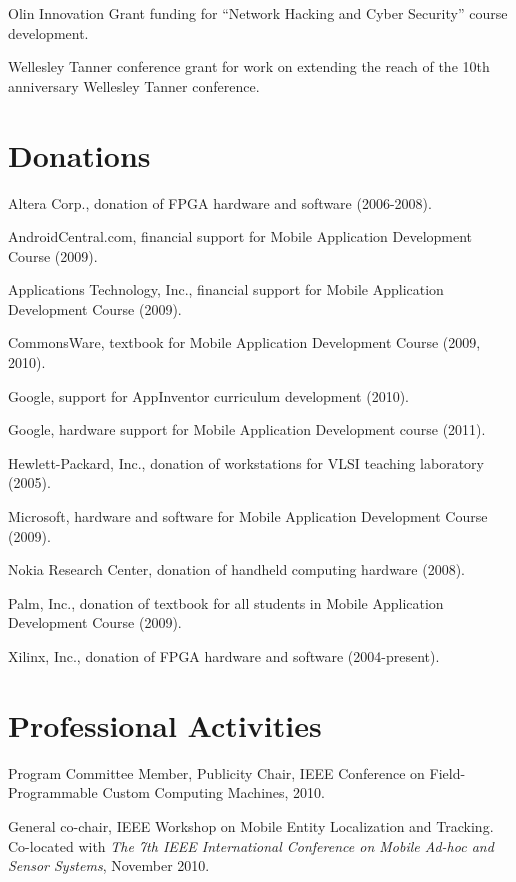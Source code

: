 \documentclass[line]{res}
\begin{document}
\begin{resume}
	Olin Innovation Grant funding for ``Network Hacking and Cyber Security'' course development.
	
	Wellesley Tanner conference grant for work on extending the reach of the 10th anniversary Wellesley Tanner conference.
	
	\section{\sc Donations}
	
	Altera Corp., donation of FPGA hardware and software (2006-2008).
	
	AndroidCentral.com, financial support for Mobile Application Development Course (2009).
	
	Applications Technology, Inc., financial support for Mobile Application Development Course (2009).
	
	CommonsWare, textbook for Mobile Application Development Course (2009, 2010).
	
	Google, support for AppInventor curriculum development (2010).
	
	Google, hardware support for Mobile Application Development course (2011).
	
	Hewlett-Packard, Inc., donation of workstations for VLSI teaching laboratory (2005).
	
	Microsoft, hardware and software for Mobile Application Development Course (2009).
	
	Nokia Research Center, donation of handheld computing hardware (2008).
	
	Palm, Inc., donation of textbook for all students in Mobile Application Development Course (2009).
	
	Xilinx, Inc., donation of FPGA hardware and software (2004-present).
	
	\section{\sc Professional Activities}
	
	Program Committee Member, Publicity Chair, IEEE Conference on Field-Programmable Custom Computing Machines, 2010.
	
	General co-chair, IEEE Workshop on Mobile Entity Localization and Tracking. Co-located with \textit{The 7th IEEE International Conference on Mobile Ad-hoc and Sensor Systems}, November 2010.
	

\end{resume}
\end{document}

